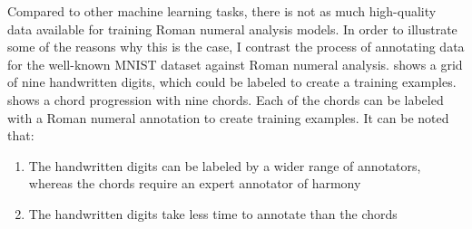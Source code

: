 

Compared to other machine learning tasks, there is not as
much high-quality data available for training Roman numeral
analysis models. In order to illustrate some of the reasons
why this is the case, I contrast the process of annotating
data for the well-known MNIST dataset
\cite{lecun1989handwritten} against Roman numeral analysis.
 shows a grid of nine handwritten digits,
which could be labeled to create a training examples.
 shows a chord progression with nine chords.
Each of the chords can be labeled with a Roman numeral
annotation to create training examples. It can be noted
that:

\begin{enumerate}
    \item The handwritten digits can be labeled by a wider
    range of annotators, whereas the chords require an
    expert annotator of harmony
    \item The handwritten digits take less time to annotate
    than the chords
\end{enumerate}


